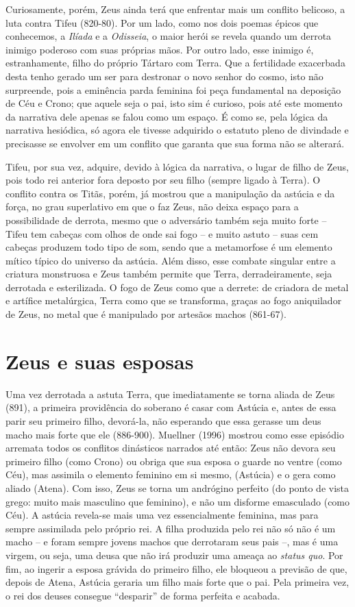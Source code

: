 Curiosamente, porém, Zeus ainda terá que enfrentar mais um conflito
belicoso, a luta contra Tifeu (820-80). Por um lado, como nos dois
poemas épicos que conhecemos, a \emph{Ilíada} e a \emph{Odisseia}, o
maior herói se revela quando um derrota inimigo poderoso com suas
próprias mãos. Por outro lado, esse inimigo é, estranhamente, filho do
próprio Tártaro com Terra. Que a fertilidade exacerbada desta tenho
gerado um ser para destronar o novo senhor do cosmo, isto não
surpreende, pois a eminência parda feminina foi peça fundamental na
deposição de Céu e Crono; que aquele seja o pai, isto sim é curioso,
pois até este momento da narrativa dele apenas se falou como um espaço.
É como se, pela lógica da narrativa hesiódica, só agora ele tivesse
adquirido o estatuto pleno de divindade e precisasse se envolver em um
conflito que garanta que sua forma não se alterará.

Tifeu, por sua vez, adquire, devido à lógica da narrativa, o lugar de
filho de Zeus, pois todo rei anterior fora deposto por seu filho (sempre
ligado à Terra). O conflito contra os Titãs, porém, já mostrou que a
manipulação da astúcia e da força, no grau superlativo em que o faz
Zeus, não deixa espaço para a possibilidade de derrota, mesmo que o
adversário também seja muito forte -- Tifeu tem cabeças com olhos de
onde sai fogo -- e muito astuto -- suas cem cabeças produzem todo tipo
de som, sendo que a metamorfose é um elemento mítico típico do universo
da astúcia. Além disso, esse combate singular entre a criatura
monstruosa e Zeus também permite que Terra, derradeiramente, seja
derrotada e esterilizada. O fogo de Zeus como que a derrete: de criadora
de metal e artífice metalúrgica, Terra como que se transforma, graças ao
fogo aniquilador de Zeus, no metal que é manipulado por artesãos machos
(861-67).

\section{Zeus e suas esposas}

Uma vez derrotada a astuta Terra, que imediatamente se torna aliada de
Zeus (891), a primeira providência do soberano é casar com Astúcia e,
antes de essa parir seu primeiro filho, devorá-la, não esperando que
essa gerasse um deus macho mais forte que ele (886-900). Muellner (1996)
mostrou como esse episódio arremata todos os conflitos dinásticos
narrados até então: Zeus não devora seu primeiro filho (como Crono) ou
obriga que sua esposa o guarde no ventre (como Céu), mas assimila o
elemento feminino em si mesmo, (Astúcia) e o gera como aliado (Atena).
Com isso, Zeus se torna um andrógino perfeito (do ponto de vista grego:
muito mais masculino que feminino), e não um disforme emasculado (como
Céu). A astúcia revela-se mais uma vez essencialmente feminina, mas para
sempre assimilada pelo próprio rei. A filha produzida pelo rei não só
não é um macho -- e foram sempre jovens machos que derrotaram seus pais
--, mas é uma virgem, ou seja, uma deusa que não irá produzir uma ameaça
ao \emph{status quo}. Por fim, ao ingerir a esposa grávida do primeiro
filho, ele bloqueou a previsão de que, depois de Atena, Astúcia geraria
um filho mais forte que o pai. Pela primeira vez, o rei dos deuses
consegue ``desparir'' de forma perfeita e acabada.

